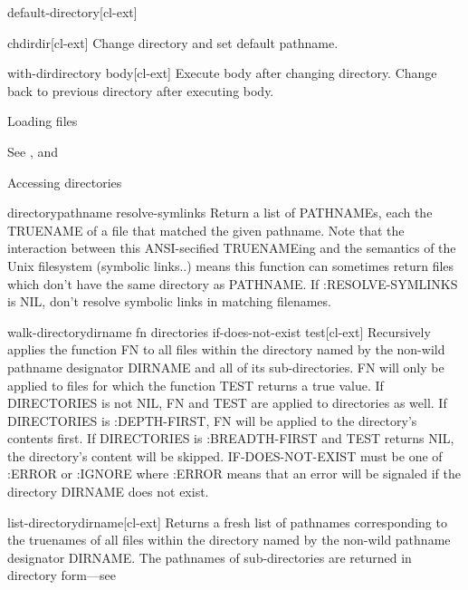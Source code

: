 \documentclass[10pt,english]{book}
\begin{document}
\begin{function}{default-directory}{}[cl-ext]
  
\end{function}

\begin{function}{chdir}{dir}[cl-ext]
  Change directory and set default pathname.
\end{function}

\begin{macro}{with-dir}{directory \body body}[cl-ext]
  Execute body after changing directory. Change back to previous
  directory after executing body.
\end{macro}

Loading files

See ,  and

Accessing directories

\begin{function}{directory}{pathname \key resolve-symlinks}
  Return a list of PATHNAMEs, each the TRUENAME of a file that matched the
   given pathname. Note that the interaction between this ANSI-secified
   TRUENAMEing and the semantics of the Unix filesystem (symbolic links..)
   means this function can sometimes return files which don't have the same
   directory as PATHNAME.  If :RESOLVE-SYMLINKS is NIL, don't resolve
   symbolic links in matching filenames.
\end{function}

\begin{function}{walk-directory}{dirname fn \key directories
    if-does-not-exist test}[cl-ext]
  Recursively applies the function FN to all files within the
  directory named by the non-wild pathname designator DIRNAME and all
  of its sub-directories. FN will only be applied to files for which
  the function TEST returns a true value. If DIRECTORIES is not NIL,
  FN and TEST are applied to directories as well. If DIRECTORIES is
  :DEPTH-FIRST, FN will be applied to the directory's contents first.
  If DIRECTORIES is :BREADTH-FIRST and TEST returns NIL, the
  directory's content will be skipped. IF-DOES-NOT-EXIST must be one
  of :ERROR or :IGNORE where :ERROR means that an error will be
  signaled if the directory DIRNAME does not exist.
\end{function}

\begin{function}{list-directory}{dirname}[cl-ext]
  Returns a fresh list of pathnames corresponding to the truenames of
  all files within the directory named by the non-wild pathname
  designator DIRNAME. The pathnames of sub-directories are returned in
  directory form---see 
\end{function}
\end{document}
